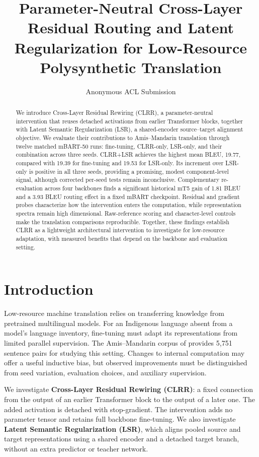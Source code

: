 \documentclass[11pt]{article}
\title{Parameter-Neutral Cross-Layer Residual Routing and Latent Regularization for Low-Resource Polysynthetic Translation}
\author{Anonymous ACL Submission}
\begin{document}
\maketitle

\begin{abstract}
We introduce Cross-Layer Residual Rewiring (CLRR), a parameter-neutral intervention that reuses detached activations from earlier Transformer blocks, together with Latent Semantic Regularization (LSR), a shared-encoder source--target alignment objective. We evaluate their contributions to Amis--Mandarin translation through twelve matched mBART-50 runs: fine-tuning, CLRR-only, LSR-only, and their combination across three seeds. CLRR+LSR achieves the highest mean BLEU, 19.77, compared with 19.39 for fine-tuning and 19.53 for LSR-only. Its increment over LSR-only is positive in all three seeds, providing a promising, modest component-level signal, although corrected per-seed tests remain inconclusive. Complementary re-evaluation across four backbones finds a significant historical mT5 gain of 1.81 BLEU and a 3.93 BLEU routing effect in a fixed mBART checkpoint. Residual and gradient probes characterize how the intervention enters the computation, while representation spectra remain high dimensional. Raw-reference scoring and character-level controls make the translation comparisons reproducible. Together, these findings establish CLRR as a lightweight architectural intervention to investigate for low-resource adaptation, with measured benefits that depend on the backbone and evaluation setting.
\end{abstract}

\section{Introduction}
Low-resource machine translation relies on transferring knowledge from pretrained multilingual models. For an Indigenous language absent from a model's language inventory, fine-tuning must adapt its representations from limited parallel supervision. The Amis--Mandarin corpus of \citet{zheng-etal-2022-parallel} provides 5,751 sentence pairs for studying this setting. Changes to internal computation may offer a useful inductive bias, but observed improvements must be distinguished from seed variation, evaluation choices, and auxiliary supervision.

We investigate \textbf{Cross-Layer Residual Rewiring (CLRR)}: a fixed connection from the output of an earlier Transformer block to the output of a later one. The added activation is detached with stop-gradient. The intervention adds no parameter tensor and retains full backbone fine-tuning. We also investigate \textbf{Latent Semantic Regularization (LSR)}, which aligns pooled source and target representations using a shared encoder and a detached target branch, without an extra predictor or teacher network.
\end{document}
